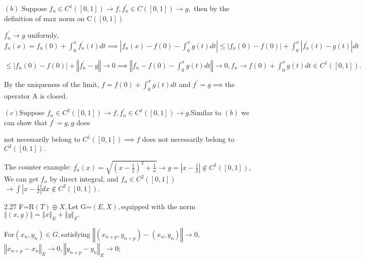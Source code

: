 \documentclass{article}
\begin{document}
$\left( b\right) $ Suppose $f_{n}\in C^{1}\left( \left[ 0,1\right] \right)
\rightarrow f,f_{n}^{\prime }\in C\left( \left[ 0,1\right] \right)
\rightarrow g,$ then by the definition of max norm on C$\left( \left[ 0,1%
\right] \right) $

$f_{n}^{\prime }\rightarrow g$ uniformly,  $f_{n}\left( x\right)
=f_{n}\left( 0\right) +\int_{0}^{x}f_{n}^{\prime }\left( t\right) dt\implies
\left\vert f_{n}\left( x\right) -f\left( 0\right) -\int_{0}^{x}g\left(
t\right) dt\right\vert \leq \left\vert f_{n}\left( 0\right) -f\left(
0\right) \right\vert +\int_{0}^{x}\left\vert f_{n}^{\prime }\left( t\right)
-g\left( t\right) \right\vert dt$

$\leq \left\vert f_{n}\left( 0\right) -f\left( 0\right) \right\vert
+\left\Vert f_{n}^{\prime }-g\right\Vert \rightarrow 0\implies \left\Vert
f_{n}-f\left( 0\right) -\int_{0}^{x}g\left( t\right) dt\right\Vert
\rightarrow 0,f_{n}\rightarrow f\left( 0\right) +\int_{0}^{x}g\left(
t\right) dt\in C^{1}\left( \left[ 0,1\right] \right) .$

By the uniqueness of the limit, $f=f\left( 0\right) +\int_{0}^{x}g\left(
t\right) dt$ and $f^{\prime }=g\implies $the operator A is closed.

$\left( c\right) $Suppose $f_{n}\in C^{2}\left( \left[ 0,1\right] \right)
\rightarrow f,f_{n}^{\prime }\in C^{1}\left( \left[ 0,1\right] \right)
\rightarrow g.$Similar to $\left( b\right) $ we can show that $f^{\prime
}=g,g$ does 

not necessarily belong to $C^{1}\left( \left[ 0,1\right] \right) \implies f$
does not necessarily belong to $C^{2}\left( \left[ 0,1\right] \right) .$

The counter example: $f_{n}^{\prime }\left( x\right) =\sqrt{\left( x-\frac{1%
}{2}\right) ^{2}+\frac{1}{n}}\rightarrow g=\left\vert x-\frac{1}{2}%
\right\vert \notin C^{1}\left( \left[ 0,1\right] \right) ,$We can get $f_{n}$
by direct integral, and $f_{n}\in C^{2}\left( \left[ 0,1\right] \right) $ $%
\rightarrow \int \left\vert x-\frac{1}{2}\right\vert dx\notin C^{2}\left( %
\left[ 0,1\right] \right) .$

2.27 F=R$\left( T\right) \oplus X,$Let G=$\left( E,X\right) ,$equipped with
the norm $\left\Vert \left( x,y\right) \right\Vert =\left\Vert x\right\Vert
_{E}+\left\Vert y\right\Vert _{F}.$

For$\left( x_{n},y_{n}\right) \in G,$satisfying $\left\Vert \left(
x_{n+p},y_{n+p}\right) -\left( x_{n},y_{n}\right) \right\Vert \rightarrow 0$,%
$\left\Vert x_{n+p}-x_{n}\right\Vert _{E}\rightarrow 0,\left\Vert
y_{n+p}-y_{n}\right\Vert _{E}\rightarrow 0;$
\end{document}
